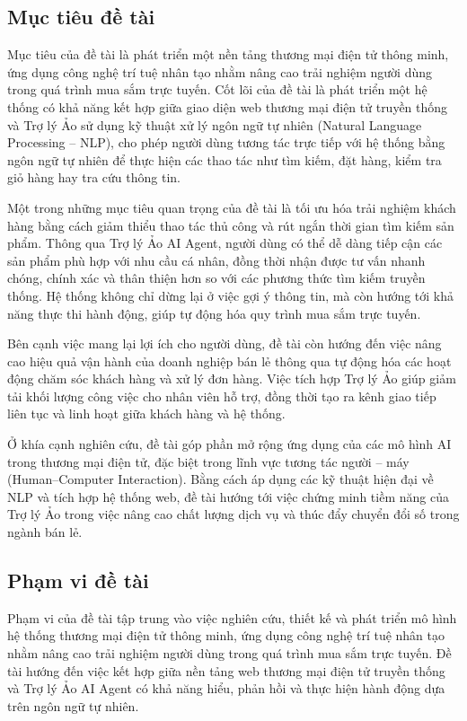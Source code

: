 \subsection{Mục tiêu đề tài}
Mục tiêu của đề tài là phát triển một nền tảng thương mại điện tử thông minh, ứng dụng công nghệ trí tuệ nhân tạo nhằm nâng cao trải nghiệm người dùng trong quá trình mua sắm trực tuyến. Cốt lõi của đề tài là phát triển một hệ thống có khả năng kết hợp giữa giao diện web thương mại điện tử truyền thống và Trợ lý Ảo sử dụng kỹ thuật xử lý ngôn ngữ tự nhiên (Natural Language Processing – NLP), cho phép người dùng tương tác trực tiếp với hệ thống bằng ngôn ngữ tự nhiên để thực hiện các thao tác như tìm kiếm, đặt hàng, kiểm tra giỏ hàng hay tra cứu thông tin.

Một trong những mục tiêu quan trọng của đề tài là tối ưu hóa trải nghiệm khách hàng bằng cách giảm thiểu thao tác thủ công và rút ngắn thời gian tìm kiếm sản phẩm. Thông qua Trợ lý Ảo AI Agent, người dùng có thể dễ dàng tiếp cận các sản phẩm phù hợp với nhu cầu cá nhân, đồng thời nhận được tư vấn nhanh chóng, chính xác và thân thiện hơn so với các phương thức tìm kiếm truyền thống. Hệ thống không chỉ dừng lại ở việc gợi ý thông tin, mà còn hướng tới khả năng thực thi hành động, giúp tự động hóa quy trình mua sắm trực tuyến.

Bên cạnh việc mang lại lợi ích cho người dùng, đề tài còn hướng đến việc nâng cao hiệu quả vận hành của doanh nghiệp bán lẻ thông qua tự động hóa các hoạt động chăm sóc khách hàng và xử lý đơn hàng. Việc tích hợp Trợ lý Ảo giúp giảm tải khối lượng công việc cho nhân viên hỗ trợ, đồng thời tạo ra kênh giao tiếp liên tục và linh hoạt giữa khách hàng và hệ thống.

Ở khía cạnh nghiên cứu, đề tài góp phần mở rộng ứng dụng của các mô hình AI trong thương mại điện tử, đặc biệt trong lĩnh vực tương tác người – máy (Human–Computer Interaction). Bằng cách áp dụng các kỹ thuật hiện đại về NLP và tích hợp hệ thống web, đề tài hướng tới việc chứng minh tiềm năng của Trợ lý Ảo trong việc nâng cao chất lượng dịch vụ và thúc đẩy chuyển đổi số trong ngành bán lẻ.

\subsection{Phạm vi đề tài}
Phạm vi của đề tài tập trung vào việc nghiên cứu, thiết kế và phát triển mô hình hệ thống thương mại điện tử thông minh, ứng dụng công nghệ trí tuệ nhân tạo nhằm nâng cao trải nghiệm người dùng trong quá trình mua sắm trực tuyến. Đề tài hướng đến việc kết hợp giữa nền tảng web thương mại điện tử truyền thống và Trợ lý Ảo AI Agent có khả năng hiểu, phản hồi và thực hiện hành động dựa trên ngôn ngữ tự nhiên.

